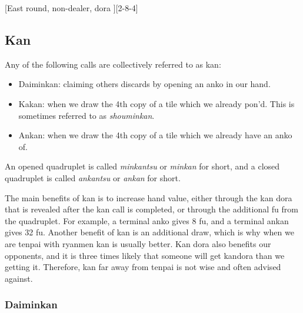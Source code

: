 \documentclass[12pt]{article}
\begin{document}
[East round, non-dealer, dora ][2-8-4]


\subsection{Kan}

Any of the following calls are collectively referred to as kan:

\begin{itemize}
\item Daiminkan: claiming others discards by opening an anko in our hand.
\item Kakan: when we draw the 4th copy of a tile which we already pon'd. This is sometimes referred to as \textit{shouminkan}.
\item Ankan: when we draw the 4th copy of a tile which we already have an anko of.
\end{itemize}

An opened quadruplet is called \textit{minkantsu} or \textit{minkan} for short, and a closed quadruplet is called \textit{ankantsu} or \textit{ankan} for short. 

The main benefits of kan is to increase hand value, either through the kan dora that is revealed after the kan call is completed, or through the additional fu from the quadruplet. For example, a terminal anko gives 8 fu, and a terminal ankan gives 32 fu. Another benefit of kan is an additional draw, which is why when we are tenpai with ryanmen kan is usually better. Kan dora also benefits our opponents, and it is three times likely that someone will get kandora than we getting it. Therefore, kan far away from tenpai is not wise and often advised against.


\subsubsection*{Daiminkan}
\end{document}
